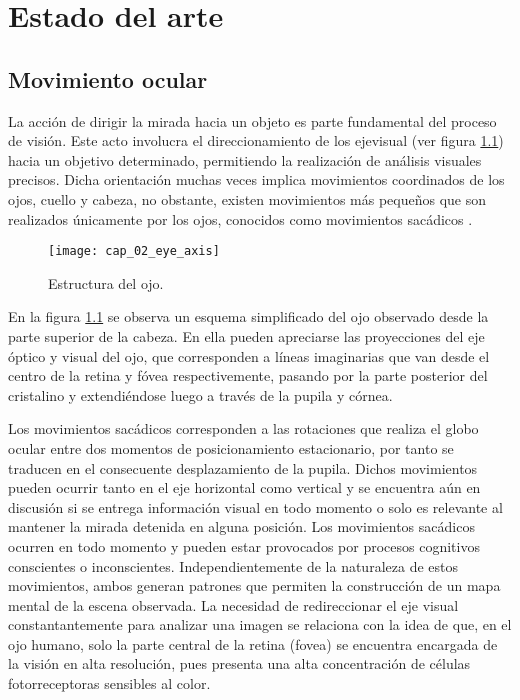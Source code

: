 \documentclass[../main.tex]{subfiles}
\begin{document}
		
\chapter{Estado del arte}
\label{cha:02_estado_del_arte}
	\section{Movimiento ocular}
	\label{sec:02_movimiento_ocular}
		La acción de dirigir la mirada hacia un objeto es parte fundamental del proceso de visión. Este acto involucra el direccionamiento de los \gls{ejevisual} (ver figura \ref{fig:02_eye_axis}) hacia un objetivo determinado, permitiendo la realización de análisis visuales precisos. Dicha orientación muchas veces implica movimientos coordinados de los ojos, cuello y cabeza, no obstante, existen movimientos más pequeños que son realizados únicamente por los ojos, conocidos como movimientos sacádicos \cite{article:movOcular1, article:movOcular2}.
		\begin{figure}[H]
			\centering
			\texttt{[image: cap\_02\_eye\_axis]}
			\caption[Estructura del ojo]{Estructura del ojo\footnotemark.}
			\label{fig:02_eye_axis}
		\end{figure}

		En la figura \ref{fig:02_eye_axis} se observa un esquema simplificado del ojo observado desde la parte superior de la cabeza. En ella pueden apreciarse las proyecciones del eje óptico y visual del ojo, que corresponden a líneas imaginarias que van desde el centro de la retina y fóvea respectivemente, pasando por la parte posterior del cristalino y extendiéndose luego a través de la pupila y córnea.  

		Los movimientos sacádicos corresponden a las rotaciones que realiza el globo ocular entre dos momentos de posicionamiento estacionario, por tanto se traducen en el consecuente desplazamiento de la pupila. Dichos movimientos pueden ocurrir tanto en el eje horizontal como vertical y se encuentra aún en discusión \cite{article:movOcular2, article:movOcular3} si se entrega información visual en todo momento o solo es relevante al mantener la mirada detenida en alguna posición. Los movimientos sacádicos ocurren en todo momento y pueden estar provocados por procesos cognitivos conscientes o inconscientes. Independientemente de la naturaleza de estos movimientos, ambos generan patrones que permiten la construcción de un mapa mental de la escena observada. La necesidad de redireccionar el eje visual constantantemente para analizar una imagen se relaciona con la idea de que, en el ojo humano, solo la parte central de la retina (\gls{fovea}) se encuentra encargada de la visión en alta resolución, pues presenta una alta concentración de células fotorreceptoras sensibles al color. 
\end{document}

